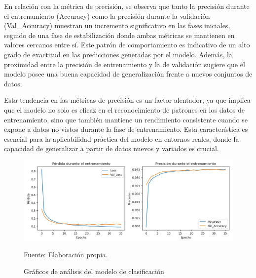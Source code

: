 En relación con la métrica de precisión, se observa que tanto la precisión durante el entrenamiento (Accuracy) como la precisión durante la validación (Val\_Accuracy) muestran un incremento significativo en las fases iniciales, seguido de una fase de estabilización donde ambas métricas se mantienen en valores cercanos entre sí. Este patrón de comportamiento es indicativo de un alto grado de exactitud en las predicciones generadas por el modelo. Además, la proximidad entre la precisión de entrenamiento y la de validación sugiere que el modelo posee una buena capacidad de generalización frente a nuevos conjuntos de datos.

Esta tendencia en las métricas de precisión es un factor alentador, ya que implica que el modelo no solo es eficaz en el reconocimiento de patrones en los datos de entrenamiento, sino que también mantiene un rendimiento consistente cuando se expone a datos no vistos durante la fase de entrenamiento. Esta característica es esencial para la aplicabilidad práctica del modelo en entornos reales, donde la capacidad de generalizar a partir de datos nuevos y variados es crucial.

\begin{figure}[H]
    \begin{minipage}[t]{0.9\textwidth}
        \caption{Gráficos de análisis del modelo de clasificación}
        \label{gráfico_clasificación}        
    \end{minipage}

    \vspace{10pt}

    \begin{minipage}[b]{1\textwidth}
        \centering
        \includegraphics[width=\textwidth]{img/Gráfico modelo clasificación.jpg}        
    \end{minipage}

    \begin{minipage}[t]{0.9\textwidth}
        Fuente: Elaboración propia.
    \end{minipage}
\end{figure}

